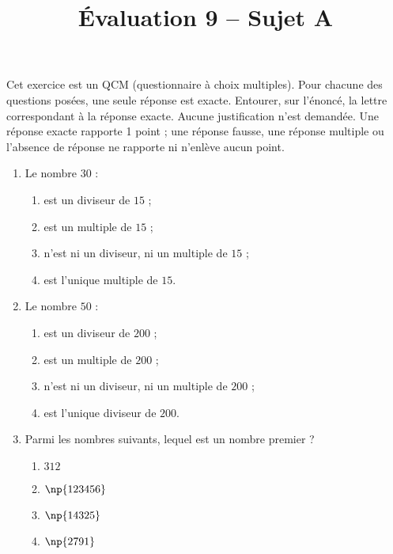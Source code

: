 \documentclass[a4paper,dvipsnames]{article}
\begin{document}
\title{Évaluation 9 -- Sujet A}
\author{}
\date{}

\maketitle{}

\pagestyle{empty}
\thispagestyle{empty}

\exo[3 points] Cet exercice est un QCM (questionnaire à choix multiples). Pour chacune des questions posées, une seule réponse est exacte. Entourer, sur l'énoncé, la lettre correspondant à la réponse exacte. Aucune justification n'est demandée. Une réponse exacte rapporte 1 point ; une réponse fausse, une réponse multiple ou l'absence de réponse ne rapporte ni n'enlève aucun point.

\begin{enumerate}
  \item Le nombre $30$ :
    \vspace{-3mm}
    \begin{multicols}{2}
      \begin{enumerate}
	\item est un diviseur de $15$ ;
	\item est un multiple de $15$ ;
	\item n'est ni un diviseur, ni un multiple de $15$ ;
	\item est l'unique multiple de $15$.
      \end{enumerate} 
    \end{multicols}
  \item Le nombre $50$ :
    \vspace{-3mm}
    \begin{multicols}{2}
      \begin{enumerate}
	\item est un diviseur de $200$ ;
	\item est un multiple de $200$ ;
	\item n'est ni un diviseur, ni un multiple de $200$ ;
	\item est l'unique diviseur de $200$.
      \end{enumerate} 
    \end{multicols}
  \item Parmi les nombres suivants, lequel est un nombre premier ?
    \vspace{-3mm}
    \begin{multicols}{4}
      \begin{enumerate}
	\item $312$
	\item $\np{123456}$
	\item $\np{14325}$
	\item $\np{2791}$
      \end{enumerate} 
    \end{multicols}
\end{enumerate}
\end{document}
